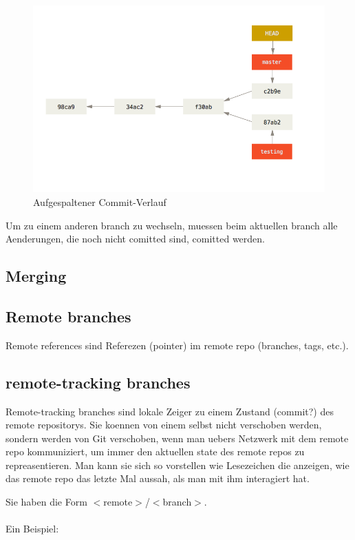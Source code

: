 \documentclass{article}
\begin{document}
\begin{figure}[h!]
    \centering
    \includegraphics[width=\textwidth]{../bilder/branch3.png}
    \caption{Aufgespaltener Commit-Verlauf}
    \label{branch3}
\end{figure} 

Um zu einem anderen branch zu wechseln, muessen beim aktuellen branch alle Aenderungen, die noch nicht comitted sind, comitted werden.

\subsection*{Merging}

\subsection*{Remote branches}

Remote references sind Referezen (pointer) im remote repo (branches, tags, etc.).

\subsection*{remote-tracking branches}
Remote-tracking branches sind lokale Zeiger zu einem Zustand (commit?) des remote repositorys. Sie koennen von einem selbst nicht verschoben werden, sondern werden von Git verschoben, wenn man uebers Netzwerk mit dem remote repo kommuniziert, um immer den aktuellen state des remote repos zu repreasentieren. Man kann sie sich so vorstellen wie Lesezeichen die anzeigen, wie das remote repo das letzte Mal aussah, als man mit ihm interagiert hat.

Sie haben die Form $<$remote$>$/$<$branch$>$.\\\\
Ein Beispiel:
\end{document}
